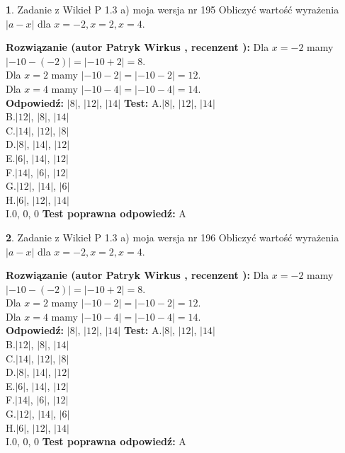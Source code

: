 \documentclass[12pt, a4paper]{article}
\theoremstyle{definition} %
\newtheorem{zad}{}
\newcommand{\zadStart}[1]{\begin{zad}#1\newline}
\newcommand{\zadStop}{\end{zad}}
\newcommand{\rozwStart}[2]{\noindent \textbf{Rozwiązanie (autor #1 , recenzent #2): }\newline}
\newcommand{\rozwStop}{\newline}
\newcommand{\odpStart}{\noindent \textbf{Odpowiedź:}\newline}
\newcommand{\odpStop}{\newline}
\newcommand{\testStart}{\noindent \textbf{Test:}\newline}
\newcommand{\testStop}{\newline}
\newcommand{\kluczStart}{\noindent \textbf{Test poprawna odpowiedź:}\newline}
\newcommand{\kluczStop}{\newline}
\begin{document}
\zadStart{Zadanie z Wikieł P 1.3 a) moja wersja nr 195}
Obliczyć wartość wyrażenia $|a - x|$ dla $x=-2,x=2,x=4$.
\zadStop
\rozwStart{Patryk Wirkus}{}
Dla $x = -2$ mamy $|-10 - (-2)| = |-10 + 2| = 8$.\\
Dla $x = 2$ mamy $|-10 - 2| = |-10 - 2| = 12$.\\
Dla $x = 4$ mamy $|-10 - 4| = |-10 - 4| = 14$.\\
\rozwStop
\odpStart
$|8|$, $|12|$, $|14|$
\odpStop
\testStart
A.$|8|$, $|12|$, $|14|$\\
B.$|12|$, $|8|$, $|14|$\\
C.$|14|$, $|12|$, $|8|$\\
D.$|8|$, $|14|$, $|12|$\\
E.$|6|$, $|14|$, $|12|$\\
F.$|14|$, $|6|$, $|12|$\\
G.$|12|$, $|14|$, $|6|$\\
H.$|6|$, $|12|$, $|14|$\\
I.$0$, $0$, $0$
\testStop
\kluczStart
A
\kluczStop



\zadStart{Zadanie z Wikieł P 1.3 a) moja wersja nr 196}
Obliczyć wartość wyrażenia $|a - x|$ dla $x=-2,x=2,x=4$.
\zadStop
\rozwStart{Patryk Wirkus}{}
Dla $x = -2$ mamy $|-10 - (-2)| = |-10 + 2| = 8$.\\
Dla $x = 2$ mamy $|-10 - 2| = |-10 - 2| = 12$.\\
Dla $x = 4$ mamy $|-10 - 4| = |-10 - 4| = 14$.\\
\rozwStop
\odpStart
$|8|$, $|12|$, $|14|$
\odpStop
\testStart
A.$|8|$, $|12|$, $|14|$\\
B.$|12|$, $|8|$, $|14|$\\
C.$|14|$, $|12|$, $|8|$\\
D.$|8|$, $|14|$, $|12|$\\
E.$|6|$, $|14|$, $|12|$\\
F.$|14|$, $|6|$, $|12|$\\
G.$|12|$, $|14|$, $|6|$\\
H.$|6|$, $|12|$, $|14|$\\
I.$0$, $0$, $0$
\testStop
\kluczStart
A
\kluczStop
\end{document}

